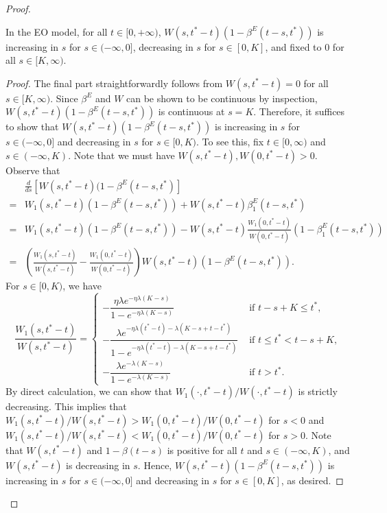\documentclass[12pt, letterpaper]{article}
\begin{document}
\begin{proof}
\begin{lem}\label{lem: V single peaked, one-shot, Model 2}
In the EO model, for all $t \in [0, +\infty)$, $W(s, t^* - t)(1- \beta^E(t-s, t^*))$ is increasing in $s$ for $s \in (-\infty, 0]$, decreasing in $s$ for $s \in [0, K]$, and fixed to $0$ for all $s \in [K, \infty)$.
\end{lem}
\begin{proof}
The final part straightforwardly follows from $W(s, t^* - t) = 0$ for all $s \in [K, \infty)$.
Since $\beta^E$ and $W$ can be shown to be continuous by inspection, $W(s, t^* - t)(1- \beta^E(t-s, t^*))$ is continuous at $s=K$. Therefore, it suffices to show that  $W(s, t^* - t)(1- \beta^E(t-s, t^*))$ is increasing in $s$ for $s \in (-\infty, 0]$ and decreasing in $s$ for $s \in [0, K)$.
To see this, fix $t\in[0,\infty)$ and $s\in(-\infty,K)$. Note that we must have $W(s, t^* - t), W(0, t^* - t)>0$. Observe that
\begin{align}
    &\frac{d}{ds}\left[W(s, t^* - t)(1 - \beta^E(t-s, t^*)\right]\\
    = & W_1(s, t^* - t)(1 - \beta^E(t-s, t^*)) + W(s, t^* - t)\beta_1^E(t-s, t^*)\\
    = & W_1(s, t^* - t)(1 - \beta^E(t-s, t^*)) - W(s, t^* - t)\frac{W_1(0, t^* - t)}{W(0, t^* - t)}(1 - \beta_1^E(t-s, t^*))\\
    = & \left(\frac{W_1(s, t^* - t)}{W(s, t^* - t)} - \frac{W_1(0, t^* - t)}{W(0, t^* - t)}\right)W(s, t^* - t) (1 - \beta^E(t-s, t^*)).%
\end{align}
For $s \in [0, K)$, we have
\begin{equation}
    \frac{W_1(s, t^* - t)}{W(s, t^* - t)} = \begin{cases}
        -\dfrac{\eta \lambda e^{- \eta \lambda (K - s)}}{1 - e^{- \eta \lambda (K - s)}} & \text{ if } t - s + K \le t^*,\\
        -\dfrac{\lambda e^{- \eta \lambda (t^* - t) - \lambda (K - s + t - t^*)}}{1 - e^{- \eta \lambda (t^* - t) - \lambda (K - s + t - t^*)}} & \text{ if } t \le t^* < t - s + K,\\
        -\dfrac{\lambda e^{- \lambda (K - s)}}{1 - e^{- \lambda (K - s)}} & \text{ if } t > t^*.
    \end{cases}
\end{equation}
By direct calculation, we can show that $W_1(\cdot, t^* - t)/W(\cdot, t^* - t)$ is strictly decreasing. This implies that $W_1(s, t^* - t)/W(s, t^* - t)>W_1(0, t^* - t)/W(0, t^* - t)$ for $s<0$ and $W_1(s, t^* - t)/W(s, t^* - t)<W_1(0, t^* - t)/W(0, t^* - t)$ for $s>0$. Note that $W(s, t^* - t)$ and $1 - \beta(t-s)$ is positive for all $t$ and $s \in (-\infty, K)$, and $W(s, t^* - t)$ is decreasing in $s$. Hence, $W(s, t^* - t)(1- \beta^E(t-s, t^*))$ is increasing in $s$ for $s \in (-\infty, 0]$ and decreasing in $s$ for $s \in [0, K]$, as desired.
\end{proof}



\end{proof}
\end{document}
